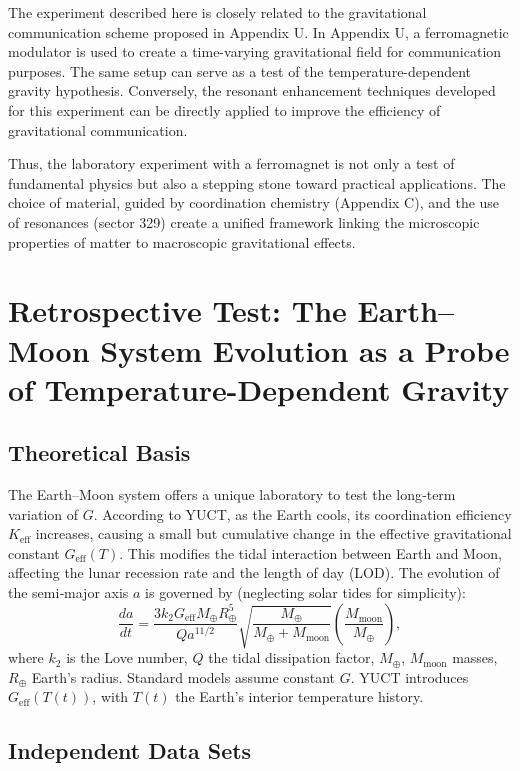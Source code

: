 \documentclass[12pt]{article}
\theoremstyle{remark}
\newcommand{\Keff}{K_{\mathrm{eff}}}
\newcommand{\Mearth}{M_{\oplus}}
\newcommand{\Mmoon}{M_{\text{moon}}}
\begin{document}
	The experiment described here is closely related to the gravitational communication scheme proposed in Appendix U. In Appendix U, a ferromagnetic modulator is used to create a time-varying gravitational field for communication purposes. The same setup can serve as a test of the temperature-dependent gravity hypothesis. Conversely, the resonant enhancement techniques developed for this experiment can be directly applied to improve the efficiency of gravitational communication.
	
	Thus, the laboratory experiment with a ferromagnet is not only a test of fundamental physics but also a stepping stone toward practical applications. The choice of material, guided by coordination chemistry (Appendix C), and the use of resonances (sector 329) create a unified framework linking the microscopic properties of matter to macroscopic gravitational effects.
	
	\section{Retrospective Test: The Earth–Moon System Evolution as a Probe of Temperature-Dependent Gravity}
	\label{sec:earth-moon}
	
	\subsection{Theoretical Basis}
	
	The Earth–Moon system offers a unique laboratory to test the long‑term variation of $G$. According to YUCT, as the Earth cools, its coordination efficiency $\Keff$ increases, causing a small but cumulative change in the effective gravitational constant $G_{\mathrm{eff}}(T)$. This modifies the tidal interaction between Earth and Moon, affecting the lunar recession rate and the length of day (LOD). The evolution of the semi‑major axis $a$ is governed by (neglecting solar tides for simplicity):
	\begin{equation}
		\frac{da}{dt} = \frac{3k_2 G_{\mathrm{eff}} \Mearth R_\oplus^5}{Q a^{11/2}} \sqrt{\frac{\Mearth}{\Mearth + \Mmoon}} \left( \frac{\Mmoon}{\Mearth} \right),
	\end{equation}
	where $k_2$ is the Love number, $Q$ the tidal dissipation factor, $\Mearth$, $\Mmoon$ masses, $R_\oplus$ Earth's radius. Standard models assume constant $G$. YUCT introduces $G_{\mathrm{eff}}(T(t))$, with $T(t)$ the Earth's interior temperature history.
	
	\subsection{Independent Data Sets}
	
\end{document}
